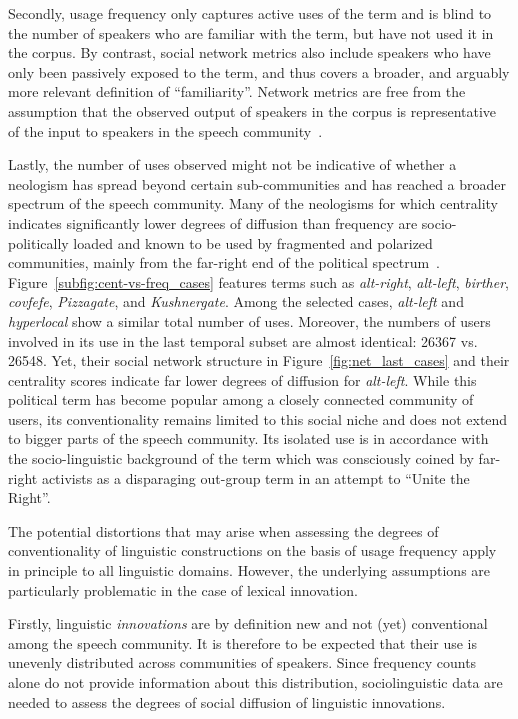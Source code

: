 \documentclass[
  a4paper,
  abstract=on,
  captions=tableabove,
  ]{scrartcl}
\newcommand{\ol}[1]{\emph{#1}}
\begin{document}
    Secondly, usage frequency only captures active uses of the term and is blind to the number of speakers who are familiar with the term, but have not used it in the corpus. By contrast, social network metrics also include speakers who have only been passively exposed to the term, and thus covers a broader, and arguably more relevant definition of \enquote{familiarity}. Network metrics are free from the assumption that the observed output of speakers in the corpus is representative of the input to speakers in the speech community~\parencite{Stefanowitsch2017CorpusbasedPerspective}.

    Lastly, the number of uses observed might not be indicative of whether a neologism has spread beyond certain sub-communities and has reached a broader spectrum of the speech community. Many of the neologisms for which centrality indicates significantly lower degrees of diffusion than frequency are socio-politically loaded and known to be used by fragmented and polarized communities, mainly from the far-right end of the political spectrum~\parencite{Sunstein2018RepublicDivided}. Figure~\ref{subfig:cent-vs-freq_cases} features terms such as \ol{alt-right}, \ol{alt-left}, \ol{birther}, \ol{covfefe}, \ol{Pizzagate}, and \ol{Kushnergate}. Among the selected cases, \ol{alt-left} and \ol{hyperlocal} show a similar total number of uses. Moreover, the numbers of users involved in its use in the last temporal subset are almost identical: \num{26367} vs. \num{26548}. Yet, their social network structure in Figure~\ref{fig:net_last_cases} and their centrality scores indicate far lower degrees of diffusion for \ol{alt-left}. While this political term has become popular among a closely connected community of users, its conventionality remains limited to this social niche and does not extend to bigger parts of the speech community. Its isolated use is in accordance with the socio-linguistic background of the term which was consciously coined by far-right activists as a disparaging out-group term in an attempt to \enquote{Unite the Right}.

    The potential distortions that may arise when assessing the degrees of conventionality of linguistic constructions on the basis of usage frequency apply in principle to all linguistic domains. However, the underlying assumptions are particularly problematic in the case of lexical innovation.

    Firstly, linguistic \emph{innovations} are by definition new and not (yet) conventional among the speech community. It is therefore to be expected that their use is unevenly distributed across communities of speakers. Since frequency counts alone do not provide information about this distribution, sociolinguistic data are needed to assess the degrees of social diffusion of linguistic innovations.  
\end{document}
